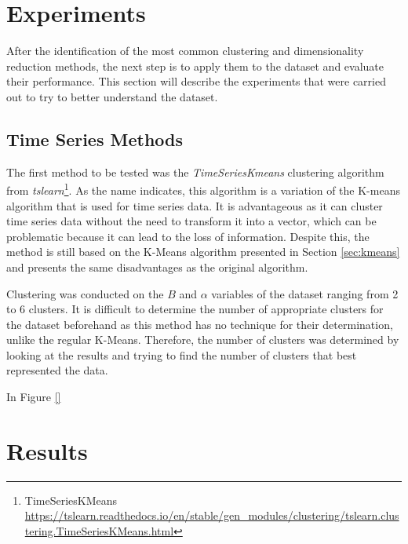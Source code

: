 
\section{Experiments}\label{sec:clustering_experiments}
After the identification of the most common clustering and dimensionality reduction methods, the next step is to apply them to the dataset and evaluate their performance. This section will describe the experiments that were carried out to try to better understand the dataset.

\subsection{Time Series Methods}\label{sec:time_series_methods}
The first method to be tested was the \textit{TimeSeriesKmeans} clustering algorithm from \textit{tslearn}\footnote{TimeSeriesKMeans \url{https://tslearn.readthedocs.io/en/stable/gen_modules/clustering/tslearn.clustering.TimeSeriesKMeans.html}}. As the name indicates, this algorithm is a variation of the K-means algorithm that is used for time series data. It is advantageous as it can cluster time series data without the need to transform it into a vector, which can be problematic because it can lead to the loss of information. Despite this, the method is still based on the K-Means algorithm presented in Section \ref{sec:kmeans} and presents the same disadvantages as the original algorithm. 

Clustering was conducted on the $B$ and $\alpha$ variables of the dataset ranging from 2 to 6 clusters. It is difficult to determine the number of appropriate clusters for the dataset beforehand as this method has no technique for their determination, unlike the regular K-Means. Therefore, the number of clusters was determined by looking at the results and trying to find the number of clusters that best represented the data.

In Figure \ref{}



\section{Results}\label{sec:clustering_results}

